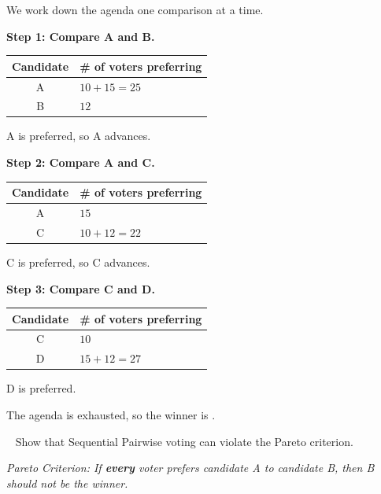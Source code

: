 \documentclass[11pt, oneside]{article}
\newcommand{\prt}[1]{\Needspace*{6\baselineskip}\vspace{1.1em}\noindent{\bf\large (#1)}\ }
\newcommand{\ans}[1]{\fbox{#1}}
\begin{document}
\begin{sol}
We work down the agenda one comparison at a time.

\vspace{0.5em}
\noindent\textbf{Step 1: Compare A and B.}
\begin{center}
\begin{tabular}{|c|l|}
\hline
\textbf{Candidate} & \textbf{\# of voters preferring} \\
\hline
A & $10 + 15 = 25$ \\
B & $12$ \\
\hline
\end{tabular}
\end{center}
A is preferred, so A advances.

\vspace{0.5em}
\noindent\textbf{Step 2: Compare A and C.}
\begin{center}
\begin{tabular}{|c|l|}
\hline
\textbf{Candidate} & \textbf{\# of voters preferring} \\
\hline
A & $15$ \\
C & $10 + 12 = 22$ \\
\hline
\end{tabular}
\end{center}
C is preferred, so C advances.

\vspace{0.5em}
\noindent\textbf{Step 3: Compare C and D.}
\begin{center}
\begin{tabular}{|c|l|}
\hline
\textbf{Candidate} & \textbf{\# of voters preferring} \\
\hline
C & $10$ \\
D & $15 + 12 = 27$ \\
\hline
\end{tabular}
\end{center}
D is preferred.

\vspace{0.5em}
\noindent The agenda is exhausted, so the winner is \ans{Candidate D}.
\end{sol}

\prt{b} Show that Sequential Pairwise voting can violate the Pareto criterion.

\vspace{0.3em}
\noindent\emph{Pareto Criterion: If \textbf{every} voter prefers candidate A to
candidate B, then B should not be the winner.}
\end{document}
